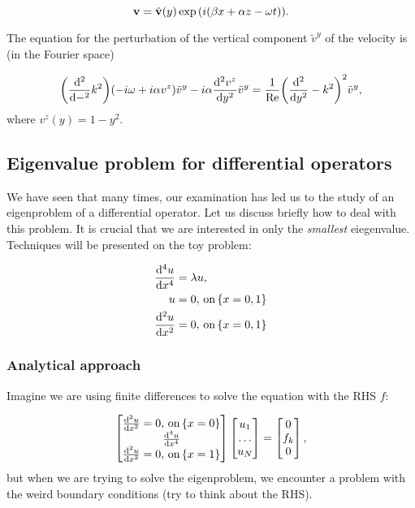 \documentclass[../main.tex]{subfiles}
\begin{document}
\[
	\vb{v} = \hat{\vb{v}}(y)\exp\qty(i \qty(\beta x + \alpha z - \omega t)).
\]

The equation for the perturbation of the vertical component $\tilde{v}^y$ of the velocity is (in the Fourier space)

\[
	\qty(\dv[2]-k^{2})\qty(-i \omega + i \alpha v^z)\tilde{v}^y - i \alpha \dv[2]{v^z}{y}\tilde{v}^y = \frac{1}{\mathrm{Re}}\qty(\dv[2]{y}-k^{2})^{2} \tilde{v}^y,
\]
where $v^z(y) = 1-y^{2}.$



\subsection{Eigenvalue problem for differential operators}
\label{sec:eigenproblem}

We have seen that many times, our examination has led us to the study of an eigenproblem of a differential operator. Let us discuss briefly how to deal with this problem. It is crucial that we are interested in only the \textit{smallest} eiegenvalue. Techniques will be presented on the toy problem:

\begin{align*}
	\dv[4]{u}{x} &= \lambda u, \\
	u &= 0, \, \text{on} \, \qty{x = 0,1}\\
	\dv[2]{u}{x} &= 0, \, \text{on} \, \qty{x = 0,1}
\end{align*}

\subsubsection{Analytical approach}
\label{sec:analytical_approoach}

Imagine we are using finite differences to solve the equation with the RHS $f$:

\[
	\begin{bmatrix}
		\dv[2]{u}{x} = 0, \, \text{on} \, \qty{x = 0} \\
		\dv[4]{u}{x} \\
		\dv[2]{u}{x} = 0, \, \text{on} \, \qty{x = 1} \\
	\end{bmatrix}
	\begin{bmatrix}
		u_1 \\
		\dots \\
		u_N
	\end{bmatrix}
	=
	\begin{bmatrix}
		0 \\
		f_k \\
		0
	\end{bmatrix},
\]
but when we are trying to solve the eigenproblem, we encounter a problem with the weird boundary conditions (try to think about the RHS).
\end{document}
